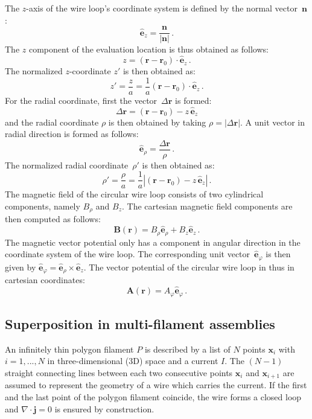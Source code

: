 The $z$-axis of the wire loop's coordinate system is defined by the normal vector~$\mathbf{n}$:
\begin{equation}
  \hat{\mathbf{e}}_z = \frac{\mathbf{n}}{|\mathbf{n}|} \, .
\end{equation}
The $z$ component of the evaluation location is thus obtained as follows:
\begin{equation}
  z = (\mathbf{r} - \mathbf{r}_0) \cdot \hat{\mathbf{e}}_z \, .
\end{equation}
The normalized $z$-coordinate $z'$ is then obtained as:
\begin{equation}
  z' = \frac{z}{a} = \frac{1}{a} (\mathbf{r} - \mathbf{r}_0) \cdot \hat{\mathbf{e}}_z \, .
\end{equation}
For the radial coordinate, first the vector~$\Delta \mathbf{r}$ is formed:
\begin{equation}
  \Delta \mathbf{r} = (\mathbf{r} - \mathbf{r}_0) - z \, \hat{\mathbf{e}}_z
\end{equation}
and the radial coordinate $\rho$ is then obtained by taking $\rho = |\Delta \mathbf{r}|$.
A unit vector in radial direction is formed as follows:
\begin{equation}
  \hat{\mathbf{e}}_\rho = \frac{\Delta \mathbf{r}}{\rho} \, .
\end{equation}
The normalized radial coordinate~$\rho'$ is then obtained as:
\begin{equation}
  \rho' = \frac{\rho}{a} = \frac{1}{a} |(\mathbf{r} - \mathbf{r}_0) - z \, \hat{\mathbf{e}}_z| \, .
\end{equation}
The magnetic field of the circular wire loop consists of two cylindrical components, namely $B_\rho$ and $B_z$.
The cartesian magnetic field components are then computed as follows:
\begin{equation}
  \mathbf{B}(\mathbf{r}) = B_\rho \hat{\mathbf{e}}_\rho + B_z \hat{\mathbf{e}}_z \, .
\end{equation}
The magnetic vector potential only has a component in angular direction in the coordinate system of the wire loop.
The corresponding unit vector~$\hat{\mathbf{e}}_\varphi$ is then given by
$\hat{\mathbf{e}}_\varphi = \hat{\mathbf{e}}_\rho \times \hat{\mathbf{e}}_z$.
The vector potential of the circular wire loop in thus in cartesian coordinates:
\begin{equation}
  \mathbf{A}(\mathbf{r}) = A_\varphi \hat{\mathbf{e}}_\varphi \, .
\end{equation}

\subsection{Superposition in multi-filament assemblies}
An infinitely thin polygon filament $P$ is described by a list of $N$ points $\mathbf{x}_i$ with $i=1, ..., N$ in three-dimensional (3D) space and a current $I$.
The $(N-1)$ straight connecting lines between each two consecutive points $\mathbf{x}_i$ and $\mathbf{x}_{i+1}$ are assumed to represent the geometry of a wire which carries the current.
If the first and the last point of the polygon filament coincide, the wire forms a closed loop and $\nabla \cdot \mathbf{j} = 0$ is ensured by construction.

